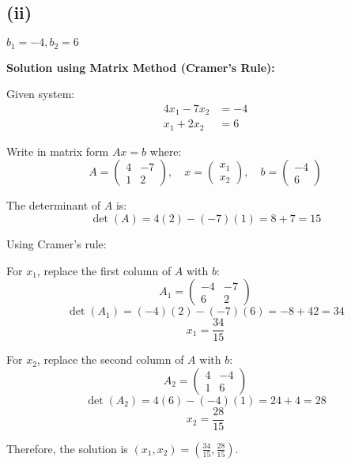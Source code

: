 \subsection*{(ii)} $b_1 = -4, b_2 = 6$

\textbf{Solution using Matrix Method (Cramer's Rule):}

Given system:
\begin{align}
	4x_1 - 7x_2 & = -4 \\
	x_1 + 2x_2  & = 6
\end{align}

Write in matrix form $Ax = b$ where:
\[
	A = \begin{pmatrix}
		4 & -7 \\
		1 & 2
	\end{pmatrix}, \quad
	x = \begin{pmatrix}
		x_1 \\
		x_2
	\end{pmatrix}, \quad
	b = \begin{pmatrix}
		-4 \\
		6
	\end{pmatrix}
\]

The determinant of $A$ is:
\[
	\det(A) = 4(2) - (-7)(1) = 8 + 7 = 15
\]

Using Cramer's rule:

For $x_1$, replace the first column of $A$ with $b$:
\[
	A_1 = \begin{pmatrix}
		-4 & -7 \\
		6  & 2
	\end{pmatrix}
\]
\[
	\det(A_1) = (-4)(2) - (-7)(6) = -8 + 42 = 34
\]
\[
	x_1 = \frac{34}{15}
\]

For $x_2$, replace the second column of $A$ with $b$:
\[
	A_2 = \begin{pmatrix}
		4 & -4 \\
		1 & 6
	\end{pmatrix}
\]
\[
	\det(A_2) = 4(6) - (-4)(1) = 24 + 4 = 28
\]
\[
	x_2 = \frac{28}{15}
\]

Therefore, the solution is $\boxed{\left(x_1, x_2\right) = \left(\frac{34}{15}, \frac{28}{15}\right)}$.
